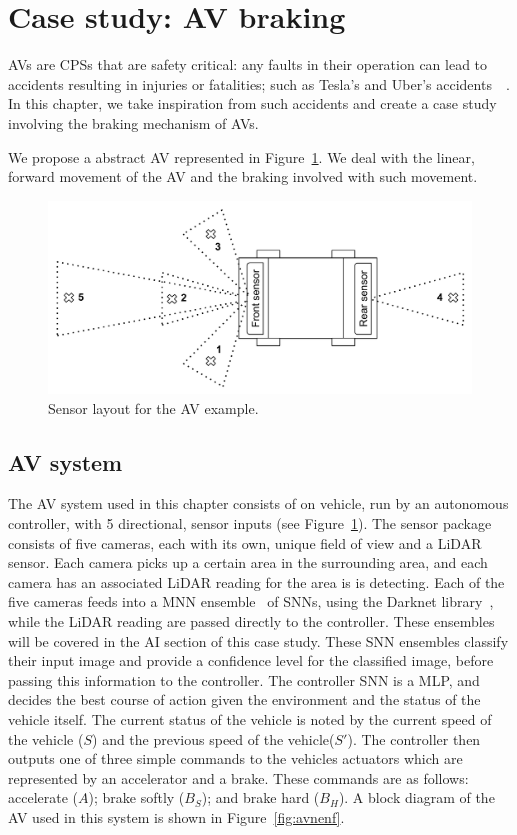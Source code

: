\section{Case study: \acf{AV} braking}
\label{sec:case}

\acfp{AV} are \acfp{CPS} that are safety critical: any faults in their operation can lead to accidents resulting in injuries or fatalities; such as Tesla's and Uber's accidents~\cite{coldewey_2018}~\cite{stewart_2018}.
In this chapter, we take inspiration from such accidents and create a case study involving the braking mechanism of \acp{AV}.

We propose a abstract \acf{AV} represented in Figure~\ref{fig:av}.
We deal with the linear, forward movement of the \ac{AV} and the braking involved with such movement.

\begin{figure}[h]
	\centering
	\includegraphics[scale=0.4]{Content/fig/AV.pdf}
	\caption{Sensor layout for the \ac{AV} example. \label{fig:av}}
\end{figure}

\subsection{\acf{AV} system}
The \ac{AV} system used in this chapter consists of on vehicle, run by an autonomous controller, with 5 directional, sensor inputs (see Figure~\ref{fig:av}).
The sensor package consists of five cameras, each with its own, unique field of view and a \acf{LiDAR} sensor.
Each camera picks up a certain area in the surrounding area, and each camera has an associated \ac{LiDAR} reading for the area is is detecting.
Each of the five cameras feeds into a \acf{MNN} ensemble~\cite{Maqsood2004} of \acp{SNN}, using the Darknet library~\cite{darknet13}, while the \ac{LiDAR} reading are passed directly to the controller.
These ensembles will be covered in the \ac{AI} section of this case study.
These \ac{SNN} ensembles classify their input image and provide a confidence level for the classified image, before passing this information to the controller.
The controller \ac{SNN} is a \ac{MLP}, and decides the best course of action given the environment and the status of the vehicle itself. 
The current status of the vehicle is noted by the current speed of the vehicle ($S$) and the previous speed of the vehicle($S'$).
The controller then outputs one of three simple commands to the vehicles actuators which are represented by an accelerator and a brake.
These commands are as follows: accelerate ($A$); brake softly ($B_S$); and brake hard ($B_H$).
A block diagram of the \ac{AV} used in this system is shown in Figure~\ref{fig:avnenf}. 

